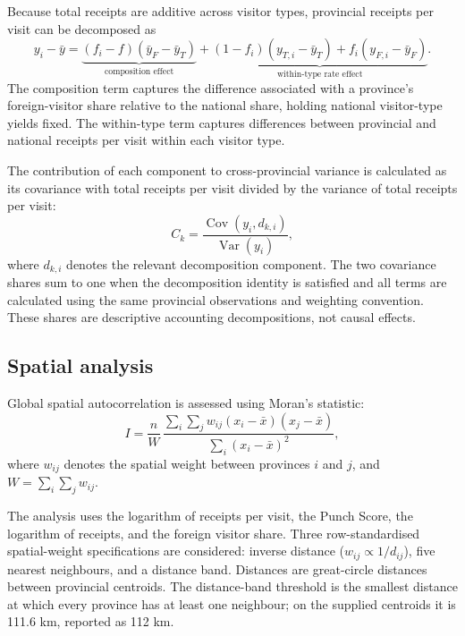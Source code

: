 \documentclass[11pt,a4paper]{article}
\begin{document}
Because total receipts are additive across visitor types, provincial receipts per visit can be decomposed as
\begin{equation}
y_i-\bar y=\underbrace{(f_i-f)(\bar y_F-\bar y_T)}_{\text{composition effect}}+\underbrace{(1-f_i)(y_{T,i}-\bar y_T)+f_i(y_{F,i}-\bar y_F)}_{\text{within-type rate effect}}.
\end{equation}
The composition term captures the difference associated with a province's foreign-visitor share relative to the national share, holding national visitor-type yields fixed. The within-type term captures differences between provincial and national receipts per visit within each visitor type.

The contribution of each component to cross-provincial variance is calculated as its covariance with total receipts per visit divided by the variance of total receipts per visit:
\begin{equation}
C_k=\frac{\operatorname{Cov}(y_i,d_{k,i})}{\operatorname{Var}(y_i)},
\end{equation}
where $d_{k,i}$ denotes the relevant decomposition component. The two covariance shares sum to one when the decomposition identity is satisfied and all terms are calculated using the same provincial observations and weighting convention. These shares are descriptive accounting decompositions, not causal effects.

\subsection{Spatial analysis}
Global spatial autocorrelation is assessed using Moran's statistic:
\begin{equation}
I=\frac{n}{W}\,\frac{\sum_i\sum_j w_{ij}(x_i-\bar x)(x_j-\bar x)}{\sum_i(x_i-\bar x)^2},
\end{equation}
where $w_{ij}$ denotes the spatial weight between provinces $i$ and $j$, and $W=\sum_i\sum_j w_{ij}$.

The analysis uses the logarithm of receipts per visit, the Punch Score, the logarithm of receipts, and the foreign visitor share. Three row-standardised spatial-weight specifications are considered: inverse distance ($w_{ij}\propto 1/d_{ij}$), five nearest neighbours, and a distance band. Distances are great-circle distances between provincial centroids. The distance-band threshold is the smallest distance at which every province has at least one neighbour; on the supplied centroids it is 111.6 km, reported as 112 km.
\end{document}
